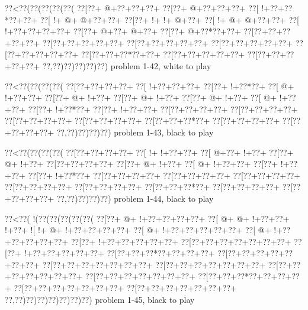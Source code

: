 \vbox{\vbox{\goo
\0??<\0??(\0??(\0??(\0??(\0??(
\0??[\0??+\- @+\0??+\0??+\0??+
\0??[\0??+\- @+\0??+\0??+\0??+
\0??[\- !+\0??+\0??*\0??+\0??+
\0??[\- !+\- @+\- @+\0??+\0??+
\0??[\0??+\- !+\- !+\- @+\0??+
\0??[\- !+\- @+\- @+\0??+\0??+
\0??[\- !+\0??+\0??+\0??+\0??+
\0??[\0??+\- @+\0??+\- @+\0??+
\0??[\0??+\- @+\0??*\0??+\0??+
\0??[\0??+\0??+\0??+\0??+\0??+
\0??[\0??+\0??+\0??+\0??+\0??+
\0??[\0??+\0??+\0??+\0??+\0??+
\0??[\0??+\0??+\0??+\0??+\0??+
\0??[\0??+\0??+\0??+\0??+\0??+
\0??[\0??+\0??+\0??*\0??+\0??+
\0??[\0??+\0??+\0??+\0??+\0??+
\0??[\0??+\0??+\0??+\0??+\0??+
\0??,\0??)\0??)\0??)\0??)\0??)
}
\hfil problem 1-42, white to play\hfil\break
}

\vbox{\vbox{\goo
\0??<\0??(\0??(\0??(\0??(
\0??[\0??+\0??+\0??+\0??+
\0??[\- !+\0??+\0??+\0??+
\0??[\0??+\- !+\0??*\0??+
\0??[\- @+\- !+\0??+\0??+
\0??[\0??+\- @+\- !+\0??+
\0??[\0??+\- @+\- !+\0??+
\0??[\0??+\- @+\- !+\0??+
\0??[\- @+\- !+\0??+\0??+
\0??[\0??+\- !+\0??*\0??+
\0??[\0??+\- !+\0??+\0??+
\0??[\0??+\0??+\0??+\0??+
\0??[\0??+\0??+\0??+\0??+
\0??[\0??+\0??+\0??+\0??+
\0??[\0??+\0??+\0??+\0??+
\0??[\0??+\0??+\0??*\0??+
\0??[\0??+\0??+\0??+\0??+
\0??[\0??+\0??+\0??+\0??+
\0??,\0??)\0??)\0??)\0??)
}
\hfil problem 1-43, black to play\hfil\break
}

\vbox{\vbox{\goo
\0??<\0??(\0??(\0??(\0??(
\0??[\0??+\0??+\0??+\0??+
\0??[\- !+\- !+\0??+\0??+
\0??[\- @+\0??+\- !+\0??+
\0??[\0??+\- @+\- !+\0??+
\0??[\0??+\0??+\0??+\0??+
\0??[\0??+\- @+\- !+\0??+
\0??[\- @+\- !+\0??+\0??+
\0??[\0??+\- !+\0??+\0??+
\0??[\0??+\- !+\0??*\0??+
\0??[\0??+\0??+\0??+\0??+
\0??[\0??+\0??+\0??+\0??+
\0??[\0??+\0??+\0??+\0??+
\0??[\0??+\0??+\0??+\0??+
\0??[\0??+\0??+\0??+\0??+
\0??[\0??+\0??+\0??*\0??+
\0??[\0??+\0??+\0??+\0??+
\0??[\0??+\0??+\0??+\0??+
\0??,\0??)\0??)\0??)\0??)
}
\hfil problem 1-44, black to play\hfil\break
}

\vbox{\vbox{\goo
\0??<\0??(\- !(\0??(\0??(\0??(\0??(\0??(
\0??[\0??+\- @+\- !+\0??+\0??+\0??+\0??+
\0??[\- @+\- @+\- !+\0??+\0??+\- !+\0??+
\- ![\- !+\- @+\- !+\0??+\0??+\0??+\0??+
\0??[\- @+\- !+\0??+\0??+\0??+\0??+\0??+
\0??[\- @+\- !+\0??+\0??+\0??+\0??+\0??+
\0??[\0??+\- !+\0??+\0??+\0??+\0??+\0??+
\0??[\0??+\0??+\0??+\0??+\0??+\0??+\0??+
\0??[\0??+\- !+\0??+\0??+\0??+\0??+\0??+
\0??[\0??+\0??+\0??*\0??+\0??+\0??+\0??+
\0??[\0??+\0??+\0??+\0??+\0??+\0??+\0??+
\0??[\0??+\0??+\0??+\0??+\0??+\0??+\0??+
\0??[\0??+\0??+\0??+\0??+\0??+\0??+\0??+
\0??[\0??+\0??+\0??+\0??+\0??+\0??+\0??+
\0??[\0??+\0??+\0??+\0??+\0??+\0??+\0??+
\0??[\0??+\0??+\0??*\0??+\0??+\0??+\0??+
\0??[\0??+\0??+\0??+\0??+\0??+\0??+\0??+
\0??[\0??+\0??+\0??+\0??+\0??+\0??+\0??+
\0??,\0??)\0??)\0??)\0??)\0??)\0??)\0??)
}
\hfil problem 1-45, black to play\hfil\break
}

